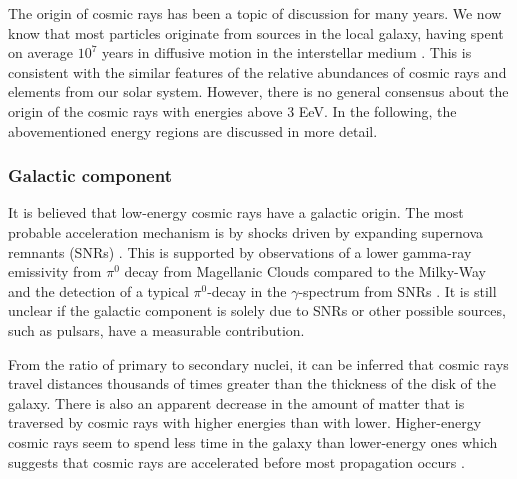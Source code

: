 The origin of cosmic rays has been a topic of discussion for many years. We now know that most particles originate from sources in the local galaxy, having spent on average $10^7$ years in diffusive motion in the interstellar medium \cite{Gaisser:2013bla}. This is consistent with the similar features of the relative abundances of cosmic rays and elements from our solar system. However, there is no general consensus about the origin of the cosmic rays with energies above 3 EeV. In the following, the abovementioned energy regions are discussed in more detail.




\subsubsection{Galactic component}
\label{subsubsec:galactic}
It is believed that low-energy cosmic rays have a galactic origin. The most probable acceleration mechanism is by shocks driven by expanding supernova remnants (SNRs) \cite{0034-4885-64-4-201}. This is supported by observations of a lower gamma-ray emissivity from $\pi^0$ decay from Magellanic Clouds compared to the Milky-Way \cite{Fermi-LAT:2010fcp} and the detection of a typical $\pi^0$-decay in the $\gamma$-spectrum from SNRs \cite{Ackermann:2013wqa}. It is still unclear if the galactic component is solely due to SNRs or other possible sources, such as pulsars, have a measurable contribution.

From the ratio of primary to secondary nuclei, it can be inferred that cosmic rays travel distances thousands of times greater than the thickness of the disk of the galaxy. There is also an apparent decrease in the amount of matter that is traversed by cosmic rays with higher energies than with lower. Higher-energy cosmic rays seem to spend less time in the galaxy than lower-energy ones which suggests that cosmic rays are accelerated before most propagation occurs \cite{Gaisser:2016uoy}.

